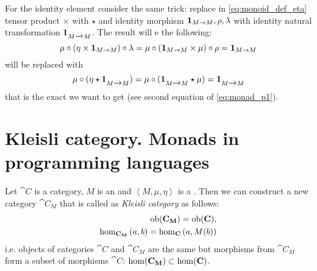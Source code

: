 For the identity element consider the same trick: replace in
\eqref{eq:monoid_def_eta} tensor
product $\times$ with  $\star$ and
identity morphism $\mathbf{1}_{ M \to M }, \rho, \lambda$ with identity natural transformation
$\mathbf{1}_{ M \xrightarrow{.} M }$. The result will e the following:
\[
\mu \circ (\eta \times \mathbf{1}_{ M \to M })
\circ \lambda = \mu \circ (\mathbf{1}_{ M \to M } \times \mu) \circ \rho =
\mathbf{1}_{ M \to M }
\]
will be replaced with
\[
\mu \circ (\eta \star \mathbf{1}_{ M \xrightarrow{.} M }) = \mu \circ (\mathbf{1}_{ M \xrightarrow{.} M } \star \mu) =
\mathbf{1}_{ M \xrightarrow{.} M }
\]
that is the exact we want to get (see second equation of
\eqref{eq:monad_p1}). 


\section{Kleisli category. Monads in programming languages}

\begin{definition}
\label{def:kleisli_category}
Let $\cat{C}$ is a category, $M$ is an  and
$\left<M, \mu, \eta\right>$ is a . Then we can
construct a new category $\cat{C_M}$ that is called as \textit{Kleisli
  category} as follows:
\begin{eqnarray}
\mathrm{ob}(\mathbf{C_M}) = \mathrm{ob}(\mathbf{C}),
\nonumber \\
\hom_{\mathbf{C_M}}\left(a, b\right) = 
\hom_{\mathbf{C}}\left(a, M(b)\right)
\nonumber
\end{eqnarray}
i.e. objects of categories $\cat{C}$ and $\cat{C_M}$ are the same but
morphisms from $\cat{C_M}$ form a subset of morphisms $\cat{C}$:
$\mathrm{hom}(\mathbf{C_M}) \subset \mathrm{hom}(\mathbf{C})$.
\end{definition}

